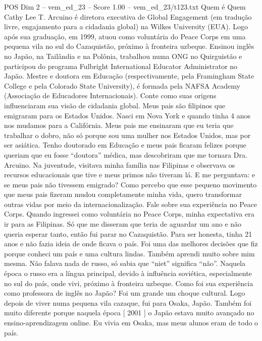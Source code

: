 \begin{textsample}{POS Dim 2 – vem\_ed\_23 – Score 1.00 – vem\_ed\_23/t123.txt}  \label{ex:f2_pos_032}
Quem é Quem Cathy Lee T.
Arcuino é diretora executiva de Global Engagement (em tradução livre, engajamento para a cidadania global) na Wilkes University (EUA).
Logo após sua graduação, em 1999, atuou como voluntária do Peace Corps em uma pequena vila no sul do Cazaquistão, próximo à fronteira uzbeque.
Ensinou inglês no Japão, na Tailândia e na Polônia, trabalhou numa ONG no Quirguistão e participou do programa Fulbright International Educator Administrator no Japão.
Mestre e doutora em Educação (respectivamente, pela Framingham State College e pela Colorado State University), é formada pela NAFSA Academy (Associação de Educadores Internacionais).
Conte como suas origens influenciaram sua visão de cidadania global.
Meus pais são filipinos que emigraram para os Estados Unidos.
Nasci em Nova York e quando tinha 4 anos nos mudamos para a Califórnia.
Meus pais me ensinaram que eu teria que trabalhar o dobro, não só porque sou uma mulher nos Estados Unidos, mas por ser asiática.
Tenho doutorado em Educação e meus pais ficaram felizes porque queriam que eu fosse “doutora” médica, mas descobriram que me tornara Dra.
Arcuino.
Na juventude, visitava minha família nas Filipinas e observava os recursos educacionais que tive e meus primos não tiveram lá.
E me perguntava: e se meus pais não tivessem emigrado?
Como percebo que esse pequeno movimento que meus pais fizeram mudou completamente minha vida, quero transformar outras vidas por meio da internacionalização.
Fale sobre sua experiência no Peace Corps.
Quando ingressei como voluntária no Peace Corps, minha expectativa era ir para as Filipinas.
Só que me disseram que teria de aguardar um ano e não queria esperar tanto, então fui parar no Cazaquistão.
Para ser honesta, tinha 21 anos e não fazia ideia de onde ficava o país.
Foi uma das melhores decisões que fiz porque conheci um país e uma cultura lindas.
Também aprendi muito sobre mim mesma.
Não falava nada de russo, só sabia que “niet” significa “não”.
Naquela época o russo era a língua principal, devido à influência soviética, especialmente no sul do país, onde vivi, próximo à fronteira uzbeque.
Como foi sua experiência como professora de inglês no Japão?
Foi um grande um choque cultural.
Logo depois de viver numa pequena vila cazaque, fui para Osaka, Japão.
Também foi muito diferente porque naquela época [ 2001 ] o Japão estava muito avançado no ensino-aprendizagem online.
Eu vivia em Osaka, mas meus alunos eram de todo o país.

\end{textsample}

